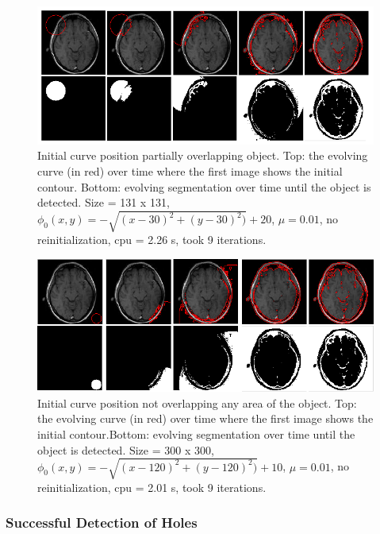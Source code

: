 \documentclass[10pt,journal,letterpaper,compsoc]{IEEEtran}
\begin{document}
\begin{figure}[t]
\centering
\includegraphics[width=12cm]{cv_eg3.png}
\caption{Initial curve position partially overlapping object. Top: the evolving curve (in red) over time where the first image shows the initial contour.
Bottom: evolving segmentation over time until the object is detected. Size = 131 x 131, $\phi_{0}(x,y) = - \sqrt{(x - 30)^2 + (y - 30)^2)} + 20$, $\mu =
0.01$, no reinitialization, cpu = 2.26 s, took 9 iterations.}
\label{fig:cv_eg3}
\end{figure}

\begin{figure}[t]
\centering
\includegraphics[width=12cm]{cv_eg4.png}
\caption{Initial curve position not overlapping any area of the object. Top: the evolving curve (in red) over time where the first image shows the initial
contour.Bottom: evolving segmentation over time until the object is detected. Size = 300 x 300, $\phi_{0}(x,y) = - \sqrt{(x - 120)^2 + (y - 120)^2)} + 10$,
$\mu =0.01$, no reinitialization, cpu = 2.01 s, took 9 iterations.}
\label{fig:cv_eg4}
\end{figure}

\subsubsection*{Successful Detection of Holes}
\end{document}
